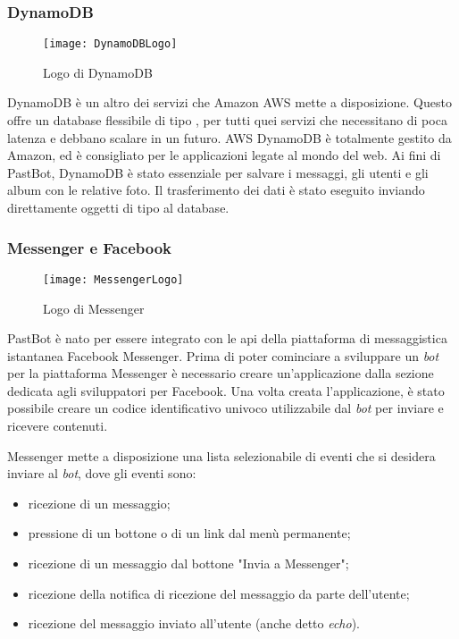 \subsubsection{DynamoDB}
\begin{figure}[H]
  \centering
  \texttt{[image: DynamoDBLogo]}
  \caption{Logo di DynamoDB}
\end{figure}
DynamoDB è un altro dei servizi che Amazon AWS mette a disposizione. Questo
offre un database flessibile di tipo , per tutti
quei servizi che necessitano di poca latenza e debbano scalare in un futuro.
AWS DynamoDB è totalmente gestito da Amazon, ed è consigliato per le
applicazioni legate al mondo del web.
Ai fini di PastBot, DynamoDB è stato essenziale per salvare i messaggi, gli
utenti e gli album con le relative foto. Il trasferimento dei dati è stato
eseguito inviando direttamente oggetti di tipo
 al database.

\subsubsection{Messenger e Facebook}
\begin{figure}[H]
  \centering
  \texttt{[image: MessengerLogo]}
  \caption{Logo di Messenger}
\end{figure}
PastBot è nato per essere integrato con le \gls{api} della piattaforma di
messaggistica istantanea Facebook Messenger.
Prima di poter cominciare a sviluppare un \textit{bot} per la piattaforma
Messenger è necessario creare un'applicazione dalla sezione dedicata agli
sviluppatori per Facebook.
Una volta creata l'applicazione, è stato possibile creare un codice
identificativo univoco utilizzabile dal \textit{bot} per inviare e ricevere
contenuti.

Messenger mette a disposizione una lista selezionabile di eventi che si desidera
inviare al \textit{bot}, dove gli eventi sono:
\begin{itemize}
  \item ricezione di un messaggio;
  \item pressione di un bottone o di un link dal menù permanente;
  \item ricezione di un messaggio dal bottone "Invia a Messenger";
  \item ricezione della notifica di ricezione del messaggio da parte
dell'utente;
  \item ricezione del messaggio inviato all'utente (anche detto \textit{echo}).
\end{itemize}

